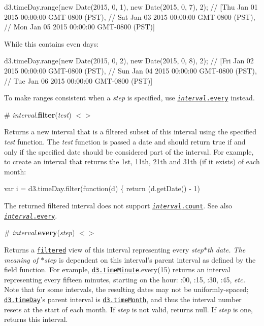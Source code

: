 \begin{DoxyCode}
d3.timeDay.range(new Date(2015, 0, 1), new Date(2015, 0, 7), 2);
// [Thu Jan 01 2015 00:00:00 GMT-0800 (PST),
//  Sat Jan 03 2015 00:00:00 GMT-0800 (PST),
//  Mon Jan 05 2015 00:00:00 GMT-0800 (PST)]
\end{DoxyCode}


While this contains even days\+:


\begin{DoxyCode}
d3.timeDay.range(new Date(2015, 0, 2), new Date(2015, 0, 8), 2);
// [Fri Jan 02 2015 00:00:00 GMT-0800 (PST),
//  Sun Jan 04 2015 00:00:00 GMT-0800 (PST),
//  Tue Jan 06 2015 00:00:00 GMT-0800 (PST)]
\end{DoxyCode}


To make ranges consistent when a {\itshape step} is specified, use \href{#interval_every}{\tt {\itshape interval}.every} instead.

\label{_interval_filter}%
\# {\itshape interval}.{\bfseries filter}({\itshape test}) \href{https://github.com/d3/d3-time/blob/master/src/interval.js#L35}{\tt $<$$>$}

Returns a new interval that is a filtered subset of this interval using the specified {\itshape test} function. The {\itshape test} function is passed a date and should return true if and only if the specified date should be considered part of the interval. For example, to create an interval that returns the 1st, 11th, 21th and 31th (if it exists) of each month\+:


\begin{DoxyCode}
var i = d3.timeDay.filter(function(d) \{ return (d.getDate() - 1) %
\end{DoxyCode}


The returned filtered interval does not support \href{#interval_count}{\tt {\itshape interval}.count}. See also \href{#interval_every}{\tt {\itshape interval}.every}.

\label{_interval_every}%
\# {\itshape interval}.{\bfseries every}({\itshape step}) \href{https://github.com/d3/d3-time/blob/master/src/interval.js#L50}{\tt $<$$>$}

Returns a \href{#interval_filter}{\tt filtered} view of this interval representing every {\itshape step$\ast$th date. The meaning of $\ast$step} is dependent on this interval’s parent interval as defined by the field function. For example, \href{#timeMinute}{\tt d3.\+time\+Minute}.every(15) returns an interval representing every fifteen minutes, starting on the hour\+: \+:00, \+:15, \+:30, \+:45, {\itshape etc.} Note that for some intervals, the resulting dates may not be uniformly-\/spaced; \href{#timeDay}{\tt d3.\+time\+Day}’s parent interval is \href{#timeMonth}{\tt d3.\+time\+Month}, and thus the interval number resets at the start of each month. If {\itshape step} is not valid, returns null. If {\itshape step} is one, returns this interval.

